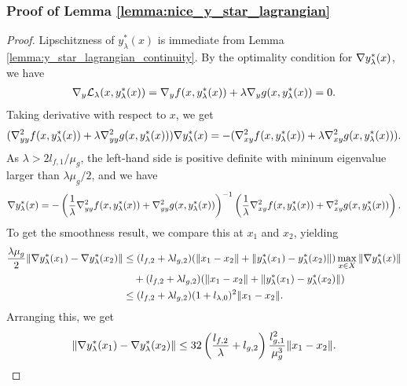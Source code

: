 \subsubsection{Proof of Lemma \ref{lemma:nice_y_star_lagrangian}}
\begin{proof}
    Lipschitzness of $y_{\lambda}^*(x)$ is immediate from Lemma \ref{lemma:y_star_lagrangian_continuity}. By the optimality condition for $\nabla y_\lambda^*(x)$, we have
    \begin{align*}
        \nabla_y \mathcal{L}_{\lambda} (x, y_{\lambda}^*(x)) = \nabla_y f (x, y_{\lambda}^*(x)) + \lambda \nabla_y g (x, y_{\lambda}^*(x)) = 0.
    \end{align*}
    Taking derivative with respect to $x$, we get
    \begin{align*}
        (\nabla_{yy}^2 f(x, y_{\lambda}^*(x)) + \lambda \nabla_{yy}^2 g(x, y_{\lambda}^*(x))) \nabla y_{\lambda}^*(x) = -(\nabla_{xy}^2 f(x, y_{\lambda}^*(x)) + \lambda \nabla_{xy}^2 g(x, y_{\lambda}^*(x))).
    \end{align*}
    As $\lambda > 2l_{f,1} / \mu_g$, the left-hand side is positive definite with mininum eigenvalue larger than $\lambda \mu_g / 2$, and we have
    \begin{align*}
        \nabla y_{\lambda}^*(x) = - \left(\frac{1}{\lambda} \nabla_{yy}^2 f(x, y_{\lambda}^*(x)) + \nabla_{yy}^2 g(x, y_{\lambda}^*(x)) \right)^{-1} \left( \frac{1}{\lambda} \nabla_{xy}^2 f(x, y_{\lambda}^*(x)) + \nabla_{xy}^2 g(x, y_{\lambda}^*(x)) \right).
    \end{align*}
    To get the smoothness result, we compare this at $x_1$ and $x_2$, yielding
    \begin{align*}
        \frac{\lambda \mu_g}{2} \|\nabla y_{\lambda}^*(x_1) - \nabla y_{\lambda}^*(x_2)\| &\le  (l_{f,2} + \lambda l_{g,2}) (\|x_1 - x_2\| + \|y_{\lambda}^*(x_1) - y_{\lambda}^*(x_2)\|) \max_{x \in X} \|\nabla y_{\lambda}^*(x)\| \\
        &\quad + (l_{f,2} + \lambda l_{g,2}) (\|x_1 - x_2\| + \|y_{\lambda}^*(x_1) - y_{\lambda}^*(x_2)\|) \\
        &\le (l_{f,2} + \lambda l_{g,2}) (1 + l_{\lambda,0})^2 \|x_1 - x_2\|. 
    \end{align*}
    Arranging this, we get
    \begin{align*}
        \|\nabla y_{\lambda}^*(x_1) - \nabla y_{\lambda}^*(x_2)\| \le 32 \left(\frac{l_{f,2}}{\lambda} + l_{g,2}\right) \frac{l_{g,1}^2}{\mu_g^3} \|x_1-x_2\|.
    \end{align*}
\end{proof}








